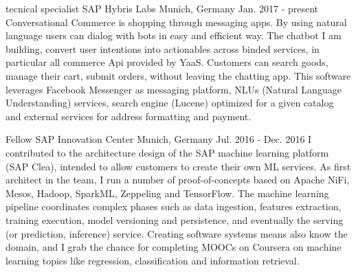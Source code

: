 

\begin{cventries}

  \cventry
    {tecnical specialist} %
    {SAP Hybris Labs} %
    {Munich, Germany} %
    {Jan. 2017 - present} %
    {
      Conversational Commerce is shopping through messaging apps. By using natural language users can dialog with bots in easy and efficient way.
      The chatbot I am building, convert user intentions into actionables across binded services, in particular all commerce Api provided by YaaS.
      Customers can search goods, manage their cart, submit orders, without leaving the chatting app.
      This software leverages Facebook Messenger as messaging platform, NLUs (Natural Language Understanding) services, search engine (Lucene)
      optimized for a given catalog and external services for address formatting and payment.
    }

  \cventry
    {Fellow} %
    {SAP Innovation Center} %
    {Munich, Germany} %
    {Jul. 2016 - Dec. 2016} %
    {
      I contributed to the architecture design of the SAP machine learning platform (SAP Clea), intended to allow customers to create their own ML services.
      As first architect in the team, I run a number of proof-of-concepts based on Apache NiFi, Mesos, Hadoop, SparkML,
      Zeppeling and TensorFlow. The machine learning pipeline coordinates complex phases such as data ingestion, features extraction, training execution,
      model versioning and persistence, and eventually the serving (or prediction, inference) service. Creating software systems means also know the domain,
      and I grab the chance for completing MOOCs on Coursera on machine learning topics like regression, classification and information retrieval.
    }


\end{cventries}

